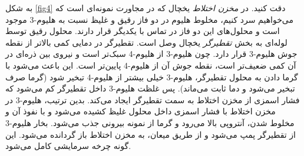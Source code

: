 \documentclass[12pt,a4paper]{article}
\begin{document}
	به شکل \ref{fig4} دقت کنید. در \emph{مخزن اختلاط} یخچال که در مجاورت نمونه‌ای است که می‌خواهیم سرد کنیم،
	مخلوط هلیوم در دو فاز رقیق و غلیظ نسبت به هلیوم-3 موجود است و محلول‌های این دو فاز در تماس با یکدیگر قرار دارند.
	محلول رقیق توسط لوله‌ای به بخش \emph{تقطیرگر} یخچال وصل است. تقطیرگر در دمایی کمی بالاتر از نقطه جوش هلیوم-3 قرار دارد.
	چون هلیوم-3 از هلیوم-4 سبک‌تر است و نیروی بین ذره‌ای در آن کمی ضعیف‌تر است، نقطه جوش آن از هلیوم-4 پایین‌تر است.
	این باعث می‌شود با گرما دادن به محلول تقطیرگر، هلیوم-3 خیلی بیشتر از هلیوم-4 تبخیر شود (گرما صرف تبخیر می‌شود و دما ثابت می‌ماند).
	پس غلظت هلیوم-3 داخل تقطیرگر کم می‌شود که فشار اسمزی از مخزن اختلاط به سمت تقطیرگر ایجاد می‌کند.
	بدین ترتیب، هلیوم-3 در مخزن اختلاط با فشار اسمزی داخل محلول غلیظ کشیده می‌شود و با نفوذ آن و مخلوط شدن، آنتروپی بالا می‌رود و گرما از نمونه بیرونی جذب می‌شود.
	بخار هلیوم-3 از تقطیرگر پمپ می‌شود و از طریق میعان، به مخزن اختلاط باز گردانده می‌شود. این گونه چرخه سرمایشی کامل می‌شود.
\end{document}
